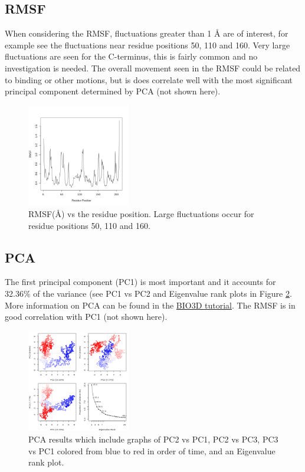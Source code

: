 \documentclass[twocolumn]{bmcart}%
\begin{document}
\subsection*{RMSF}
When considering the RMSF, fluctuations greater than 1 {\AA} are of interest, for example see the fluctuations near residue positions 50, 110 and 160. Very large fluctuations are seen for the C-terminus, this is fairly common and no investigation is needed. The overall movement seen in the RMSF could be related to binding or other motions, but is does correlate well with the most significant principal component determined by PCA (not shown here).

\begin{figure}[h!]
  \includegraphics[width=0.4\textwidth]{htmd_analysis_rmsf}
  \caption{
      RMSF(\AA) vs the residue position. Large fluctuations occur for residue positions 50, 110 and 160. }
\label{fig:rmsf}
\end{figure}

\subsection*{PCA}

The first principal component (PC1) is most important and it accounts for
32.36\% of the variance (see PC1 vs PC2 and Eigenvalue rank plots in Figure \ref{fig:pca}. More
information on PCA can be found in the \href{http://thegrantlab.org/bio3d/tutorials/trajectory-analysis}{BIO3D tutorial}. The RMSF is in good correlation with PC1 (not shown here).

\begin{figure}[h!]
  \includegraphics[width=0.4\textwidth]{htmd_analysis_pca}
  \caption{
      PCA results which include graphs of PC2 vs PC1, PC2 vs PC3, PC3 vs PC1  colored from blue to red in order of time, and an Eigenvalue rank plot. }
 \label{fig:pca}
 \end{figure}
\end{document}
